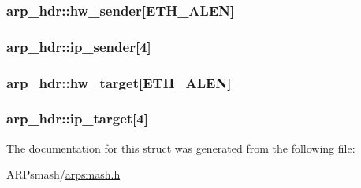 \hypertarget{structarp__hdr_2216ff9db997f4f12cc35583f7ee783b}{
\subsubsection{ {\bf arp\_\-hdr::hw\_\-sender}\mbox{[}ETH\_\-ALEN\mbox{]}}}
\label{structarp__hdr_2216ff9db997f4f12cc35583f7ee783b}


\hypertarget{structarp__hdr_4c9e5dd5d08a13b5e539159524ac9eb1}{
\subsubsection{ {\bf arp\_\-hdr::ip\_\-sender}\mbox{[}4\mbox{]}}}
\label{structarp__hdr_4c9e5dd5d08a13b5e539159524ac9eb1}


\hypertarget{structarp__hdr_77314b08c95679f9ac5436b05d0cdd2b}{
\subsubsection{ {\bf arp\_\-hdr::hw\_\-target}\mbox{[}ETH\_\-ALEN\mbox{]}}}
\label{structarp__hdr_77314b08c95679f9ac5436b05d0cdd2b}


\hypertarget{structarp__hdr_d02fd53a22a4b462103130db81848458}{
\subsubsection{ {\bf arp\_\-hdr::ip\_\-target}\mbox{[}4\mbox{]}}}
\label{structarp__hdr_d02fd53a22a4b462103130db81848458}




The documentation for this struct was generated from the following file:\begin{CompactItemize}
\item 
ARPsmash/\hyperlink{arpsmash_8h}{arpsmash.h}\end{CompactItemize}
